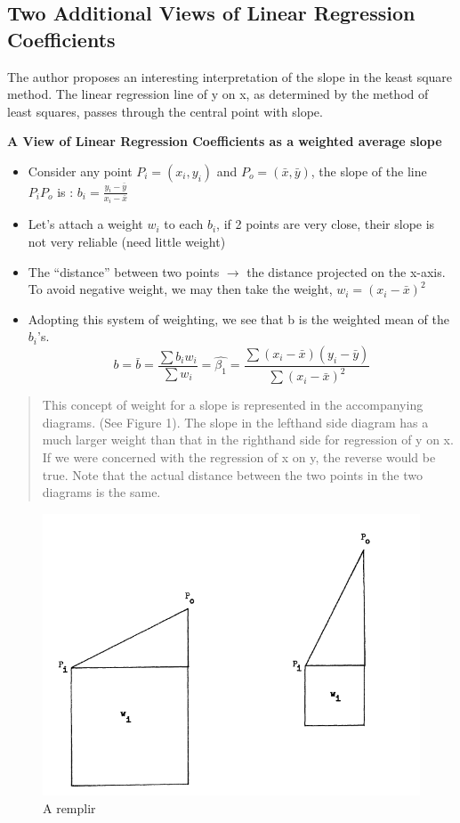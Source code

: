\documentclass[
]{report}
\providecommand{\tightlist}{%
  \setlength{\itemsep}{0pt}\setlength{\parskip}{0pt}}
\begin{document}
\hypertarget{two-additional-views-of-linear-regression-coefficients}{%
\subsection{Two Additional Views of Linear Regression Coefficients}\label{two-additional-views-of-linear-regression-coefficients}}

The author \citep{Cli} proposes an interesting interpretation of the slope in the keast square method. The linear regression line of y on x, as determined by the method of least squares, passes through the central point with slope.

\textbf{A View of Linear Regression Coefficients as a weighted average slope}

\begin{itemize}
\tightlist
\item
  Consider any point \(P_i=(x_i,y_i)\) and \(P_o=(\bar{x}, \bar{y})\), the slope of the line \(P_i P_o\) is : \(b_i=\frac{y_i -\bar{y}}{x_i-\bar{x}}\)
\item
  Let's attach a weight \(w_i\) to each \(b_i\), if 2 points are very close, their slope is not very reliable (need little weight)
\item
  The ``distance'' between two points \(\to\) the distance projected on the x-axis. To avoid negative weight, we may then take the weight, \(w_i=(x_i-\bar{x})^2\)
\item
  Adopting this system of weighting, we see that b is the weighted mean of the \(b_i\)'s.
  \begin{equation}
  b=\bar{b}=\frac{\sum b_i w_i}{\sum w_i} = \hat{\beta_1} = \frac{\sum(x_i -\bar{x})(y_i -\bar{y})}{\sum(x_i -\bar{x})^2}
  \end{equation}
\end{itemize}

\begin{quote}
This concept of weight for a slope is represented in the accompanying diagrams. (See Figure 1). The slope in the lefthand side diagram has a much larger weight than that in the righthand side for regression of y on x. If we were concerned with the regression of x on y, the reverse would be true. Note that the actual distance between the two points in the two diagrams is the same.
\end{quote}

\begin{figure}
    \centering
    \includegraphics[width= 250 pt]{LI_slope.PNG}
    \caption{A remplir}
\end{figure}
\end{document}
